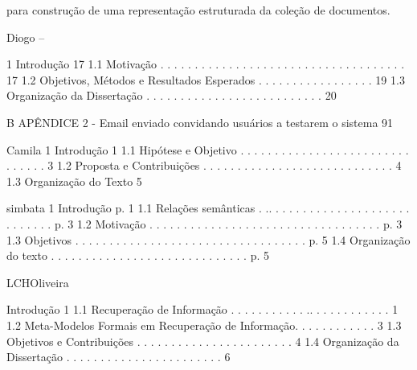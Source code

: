 para construção de uma representação estruturada da coleção de documentos.





























Diogo --

1 Introdução
17
1.1 Motivação . . . . . . . . . . . . . . . . . . . . . . . . . . . . . . . . . . . . 17
1.2 Objetivos, Métodos e Resultados Esperados . . . . . . . . . . . . . . . . . 19
1.3 Organização da Dissertação . . . . . . . . . . . . . . . . . . . . . . . . . . 20

B APÊNDICE 2 - Email enviado convidando usuários a testarem o sistema 91



Camila
1 Introdução
1
1.1 Hipótese e Objetivo . . . . . . . . . . . . . . . . . . . . . . . . . . . . . . . 3
1.2 Proposta e Contribuições . . . . . . . . . . . . . . . . . . . . . . . . . . . . 4
1.3 Organização do Texto 5


simbata
1
Introdução p. 1
1.1 Relações semânticas . .. . . . . . . . . . . . . . . . . . . . . . . . . . . . p. 3
1.2 Motivação . . . . . . .  . . . . . . . . . . . . . . . . . . . . . . . . . . . p. 3
1.3 Objetivos . . . . . . .  . . . . . . . . . . . . . . . . . . . . . . . . . . . p. 5
1.4 Organização do texto . . . . . . . . . . . . . . . . . . . . . . . . . . . . . p. 5





LCHOliveira

Introdução 1
1.1 Recuperação de Informação . . . . . . . . . . . .. . . . . . . . . . . . 1
1.2 Meta-Modelos Formais em Recuperação de Informação. . . . . . . . . . . . 3
1.3 Objetivos e Contribuições  . . . . . . . . . . . . . . . . . . . . . . . 4
1.4 Organização da Dissertação . . . . . . . . . . . . . . . . . . . . . . . 6

